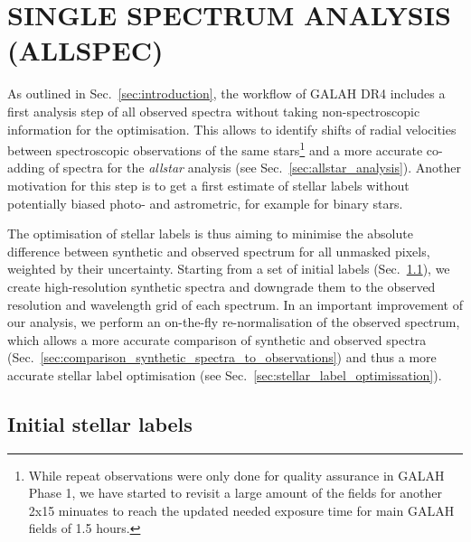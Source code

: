 \documentclass[
  journal=pasa,
  manuscript=research-paper, %
  year=2023,
  volume=37
]{cup-journal}
\begin{document}
\section{SINGLE SPECTRUM ANALYSIS (ALLSPEC)}
\label{sec:allspec_analysis}

As outlined in Sec.~\ref{sec:introduction}, the workflow of GALAH DR4 includes a first analysis step of all observed spectra without taking non-spectroscopic information for the optimisation. This allows to identify shifts of radial velocities between spectroscopic observations of the same stars\footnote{While repeat observations were only done for quality assurance in GALAH Phase 1, we have started to revisit a large amount of the fields for another 2x15 minuates to reach the updated needed exposure time for main GALAH fields of 1.5 hours.} and a more accurate co-adding of spectra for the \textit{allstar} analysis (see Sec.~\ref{sec:allstar_analysis}). Another motivation for this step is to get a first estimate of stellar labels without potentially biased photo- and astrometric, for example for binary stars.

The optimisation of stellar labels is thus aiming to minimise the absolute difference between synthetic and observed spectrum for all unmasked pixels, weighted by their uncertainty. Starting from a set of initial labels (Sec.~\ref{sec:initial_stellar_labels}), we create high-resolution synthetic spectra and downgrade them to the observed resolution and wavelength grid of each spectrum. In an important improvement of our analysis, we perform an on-the-fly re-normalisation of the observed spectrum, which allows a more accurate comparison of synthetic and observed spectra (Sec.~\ref{sec:comparison_synthetic_spectra_to_observations}) and thus a more accurate stellar label optimisation (see Sec.~\ref{sec:stellar_label_optimissation}).

\subsection{Initial stellar labels}
\label{sec:initial_stellar_labels}

\end{document}
